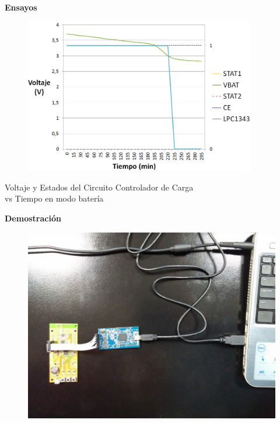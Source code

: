 \documentclass[aspectratio=43, handout]{beamer}
\begin{document}
\begin{frame}{\textbf{\LARGE{Ensayos}}}
\begin{center}
		\begin{figure}[H]
			{\includegraphics[width=0.9\textwidth]{./imagenes/descargas.PNG}}
		\end{figure}	 
		\vspace{10px} 
		Voltaje y Estados del Circuito Controlador de Carga\\
		vs Tiempo en modo batería
\end{center}	 	  	
\end{frame}

\begin{frame}{\textbf{\LARGE{Demostración}}}
\begin{center}
		\begin{figure}[H]
			{\includegraphics[width=.9\textwidth]{./imagenes/debu.jpg}}
		\end{figure}	  
\end{center}	 	  	
\end{frame}
\end{document}
